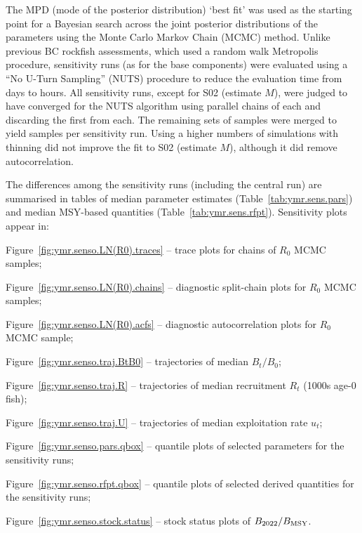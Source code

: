 \documentclass[11pt]{book}
\newcommand{\Bmsy}{B_\mathrm{MSY}}
\begin{document}
The MPD (mode of the posterior distribution) `best fit' was used as the starting point for a Bayesian search across the joint posterior distributions of the parameters using the Monte Carlo Markov Chain (MCMC) method.
Unlike previous BC rockfish assessments, which used a random walk Metropolis procedure, sensitivity runs (as for the base components) were evaluated using a ``No U-Turn Sampling'' (NUTS) procedure to reduce the evaluation time from days to hours.
All sensitivity runs, except for S02 (estimate $M$), were judged to have converged for the NUTS algorithm using \nChains{} parallel chains of \cSims{} each and discarding the first \cBurn{} from each. 
The remaining \nChains{} sets of \cSamps{} samples were merged to yield \Nmcmc{} samples per sensitivity run.
Using a higher numbers of simulations with thinning did not improve the fit to S02 (estimate $M$), although it did remove autocorrelation.

The differences among the sensitivity runs (including the central run) are summarised in tables of median parameter estimates (Table~\ref{tab:ymr.sens.pars}) and median MSY-based quantities (Table~\ref{tab:ymr.sens.rfpt}).
Sensitivity plots appear in:
\vspace{-0.5\baselineskip}%
\begin{itemize_csas}
  \item Figure~\ref{fig:ymr.senso.LN(R0).traces} -- trace plots for chains of $R_0$ MCMC samples;
  \item Figure~\ref{fig:ymr.senso.LN(R0).chains} -- diagnostic split-chain plots for $R_0$ MCMC samples;
  \item Figure~\ref{fig:ymr.senso.LN(R0).acfs} -- diagnostic autocorrelation plots for $R_0$ MCMC sample;
  \item Figure~\ref{fig:ymr.senso.traj.BtB0} -- trajectories of median $B_t/B_0$;
  \item Figure~\ref{fig:ymr.senso.traj.R} -- trajectories of  median recruitment $R_t$ (1000s age-0 fish);
  \item Figure~\ref{fig:ymr.senso.traj.U} -- trajectories of median exploitation rate $u_t$;
  \item Figure~\ref{fig:ymr.senso.pars.qbox} -- quantile plots of selected parameters for the sensitivity runs;
  \item Figure~\ref{fig:ymr.senso.rfpt.qbox} -- quantile plots of selected derived quantities for the sensitivity runs;
  \item Figure~\ref{fig:ymr.senso.stock.status} -- stock status plots of $B_{\currYear}/\Bmsy$.
 \end{itemize_csas}
\end{document}
